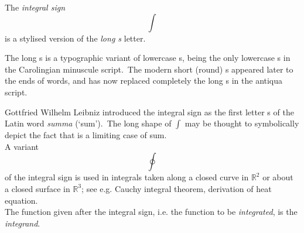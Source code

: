 \documentclass[12pt]{article}
\theoremstyle{definition}
\begin{document}
The {\em integral sign}
                               $$\int$$
is a stylised version of the {\em long s} letter.

The long s is a typographic variant of lowercase s, being the only lowercase s in the Carolingian minuscule script.\, The 
modern short (round) s appeared later to the ends of words, and has now replaced completely the long s in the antiqua script.

Gottfried Wilhelm Leibniz introduced the integral sign as the first letter s of the Latin word {\em summa} (`sum').\, The long shape of $\displaystyle\int$ may be thought to symbolically depict the fact that  is a limiting case of sum.\\

A variant 
$$\oint$$
of the integral sign is used in integrals taken along a closed curve in $\mathbb{R}^2$ or about a closed surface in $\mathbb{R}^3$; see e.g. Cauchy integral theorem, derivation of heat equation.\\

The function given after the integral sign, i.e. the function to be {\em integrated}, is the {\em integrand}.
\end{document}
